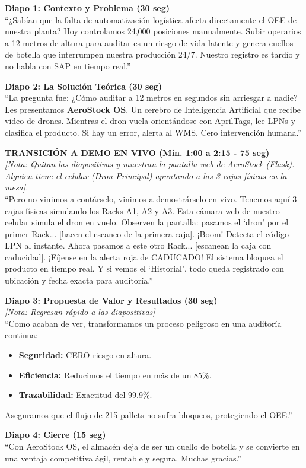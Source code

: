 \documentclass[12pt, a4paper]{article}
\begin{document}
\textbf{Diapo 1: Contexto y Problema (30 seg)} \\
``¿Sabían que la falta de automatización logística afecta directamente el OEE de nuestra planta? Hoy controlamos 24,000 posiciones manualmente. Subir operarios a 12 metros de altura para auditar es un riesgo de vida latente y genera cuellos de botella que interrumpen nuestra producción 24/7. Nuestro registro es tardío y no habla con SAP en tiempo real.''

\textbf{Diapo 2: La Solución Teórica (30 seg)} \\
``La pregunta fue: ¿Cómo auditar a 12 metros en segundos sin arriesgar a nadie? Les presentamos \textbf{AeroStock OS}. Un cerebro de Inteligencia Artificial que recibe video de drones. Mientras el dron vuela orientándose con AprilTags, lee LPNs y clasifica el producto. Si hay un error, alerta al WMS. Cero intervención humana.''

\textbf{TRANSICIÓN A DEMO EN VIVO (Min. 1:00 a 2:15 - 75 seg)} \\
\textit{[Nota: Quitan las diapositivas y muestran la pantalla web de AeroStock (Flask). Alguien tiene el celular (Dron Principal) apuntando a las 3 cajas físicas en la mesa].} \\
``Pero no vinimos a contárselo, vinimos a demostrárselo en vivo. Tenemos aquí 3 cajas físicas simulando los Racks A1, A2 y A3. Esta cámara web de nuestro celular simula el dron en vuelo. Observen la pantalla: pasamos el `dron' por el primer Rack... [hacen el escaneo de la primera caja]. ¡Boom! Detecta el código LPN al instante. Ahora pasamos a este otro Rack... [escanean la caja con caducidad]. ¡Fíjense en la alerta roja de CADUCADO! El sistema bloquea el producto en tiempo real. Y si vemos el `Historial', todo queda registrado con ubicación y fecha exacta para auditoría.''

\textbf{Diapo 3: Propuesta de Valor y Resultados (30 seg)} \\
\textit{[Nota: Regresan rápido a las diapositivas]} \\
``Como acaban de ver, transformamos un proceso peligroso en una auditoría continua:
\begin{itemize}
    \item \textbf{Seguridad:} CERO riesgo en altura.
    \item \textbf{Eficiencia:} Reducimos el tiempo en más de un 85\%.
    \item \textbf{Trazabilidad:} Exactitud del 99.9\%.
\end{itemize}
Aseguramos que el flujo de 215 pallets no sufra bloqueos, protegiendo el OEE.''

\textbf{Diapo 4: Cierre (15 seg)} \\
``Con AeroStock OS, el almacén deja de ser un cuello de botella y se convierte en una ventaja competitiva ágil, rentable y segura. Muchas gracias.''
\end{document}
